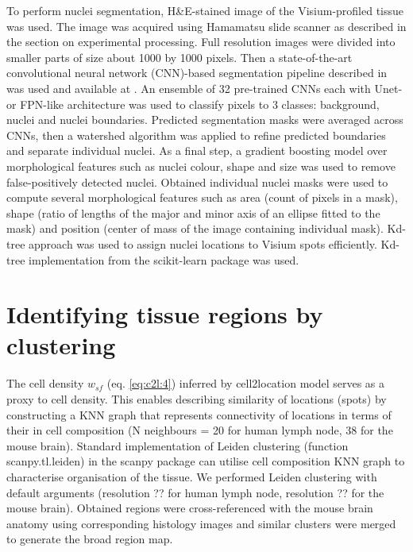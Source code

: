 \documentclass[11pt,a4paper]{article}
\begin{document}
To perform nuclei segmentation, H&E-stained image of the Visium-profiled tissue was used. The image was acquired using Hamamatsu slide scanner as described in the section on experimental processing. Full resolution images were divided into smaller parts of size about 1000 by 1000 pixels. Then a state-of-the-art convolutional neural network (CNN)-based segmentation pipeline described in \cite{caicedo_nucleus_2019} was used and available at \cite{'https://github.com/selimsef/dsb2018_topcoders'}. An ensemble of 32 pre-trained CNNs each with Unet- or FPN-like architecture was used to classify pixels to 3 classes: background, nuclei and nuclei boundaries. Predicted segmentation masks were averaged across CNNs, then a watershed algorithm was applied to refine predicted boundaries and separate individual nuclei. As a final step, a gradient boosting model over morphological features such as nuclei colour, shape and size was used to remove false-positively detected nuclei.  
Obtained individual nuclei masks were used to compute several morphological features such as area (count of pixels in a mask), shape (ratio of lengths of the major and minor axis of an ellipse fitted to the mask) and position (center of mass of the image containing individual mask).
Kd-tree approach was used to assign nuclei locations to Visium spots efficiently. Kd-tree implementation from the scikit-learn package was used.


\section{Identifying tissue regions by clustering} \label{auto_clustering}

The cell density $w_{sf}$ (eq. \ref{eq:c2l:4}) inferred by cell2location model serves as a proxy to cell density. This enables describing similarity of locations (spots) by constructing a KNN graph that represents connectivity of locations in terms of their in cell composition (N neighbours = 20 for human lymph node, 38 for the mouse brain). Standard implementation of Leiden clustering (function scanpy.tl.leiden) in the scanpy package \cite{wolf_scanpy_2018} can utilise cell composition KNN graph to characterise organisation of the tissue. We performed Leiden clustering with default arguments (resolution ?? for human lymph node, resolution ?? for the mouse brain). Obtained regions were cross-referenced with the mouse brain anatomy using corresponding histology images and similar clusters were merged to generate the broad region map.
\end{document}
